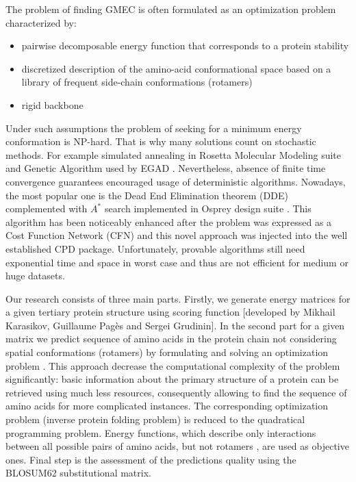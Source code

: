 \documentclass[12pt,twoside]{article}
\begin{document}
The problem of finding GMEC is often formulated as an optimization problem characterized by:
\begin{itemize}
\item pairwise decomposable energy function that corresponds to a protein stability
\item discretized description of the amino-acid conformational space based on a library of frequent side-chain conformations (rotamers)
\item rigid backbone
\end{itemize}
Under such assumptions the problem of seeking for a minimum energy conformation is NP-hard. That is why many solutions count on stochastic methods. For example simulated annealing in Rosetta Molecular Modeling suite \cite{Rosetta3} and Genetic Algorithm used by EGAD \cite{CPDlib}. Nevertheless, absence of finite time convergence guarantees encouraged usage of deterministic algorithms. Nowadays, the most popular one is the Dead End Elimination theorem (DDE) \cite{DDE:1992} complemented with $A^*$ search implemented in Osprey design suite  \cite{Osprey:2013}.
This algorithm has been noticeably enhanced after the problem was
expressed as a Cost Function Network (CFN) and this novel approach \cite{Traore:2016} was injected into the well established
CPD package. Unfortunately, provable algorithms still need exponential time and space in worst case and thus are not efficient for medium or huge datasets.
\bigskip

Our research consists of three main parts. 
Firstly, we generate energy matrices for a given tertiary protein structure using scoring function [developed by Mikhail Karasikov, Guillaume Pagès and Sergei Grudinin].
In the second part for a given matrix we predict sequence of amino acids in the protein chain not considering spatial conformations (rotamers) by formulating and solving an optimization problem \cite{Riazanov:2016}.
This approach decrease the computational complexity
of the problem significantly: basic information about the primary structure of a protein can be retrieved using much less resources, consequently allowing to find the sequence of amino acids for more complicated instances.
The corresponding optimization problem (inverse protein folding problem) is reduced to the quadratical programming problem. Energy functions, which describe only interactions between all possible pairs of amino acids, but not rotamers \cite{Rajgaria:2006}, are used as objective ones.
Final step is the assessment of the predictions quality using the BLOSUM62 \cite{Henikoff92} substitutional matrix.
\end{document}
